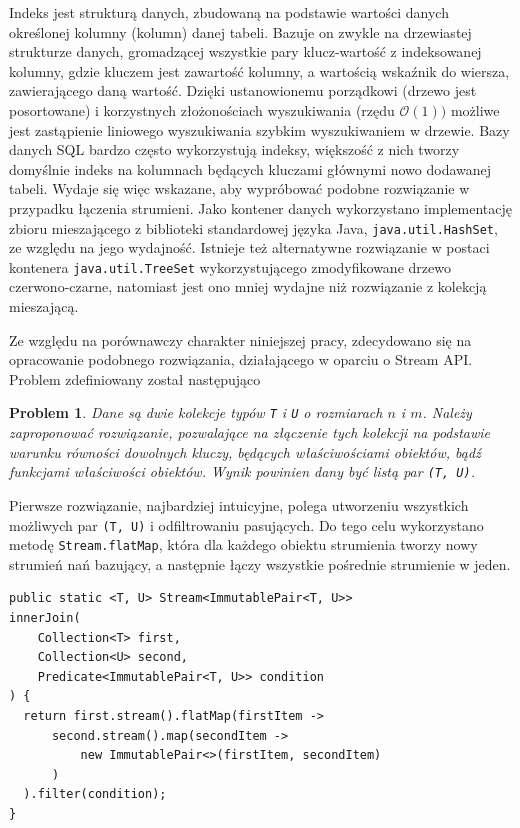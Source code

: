 \documentclass[12pt]{extarticle}
\newtheorem{theorem}{Problem}
\begin{document}
    Indeks jest strukturą danych, zbudowaną na podstawie wartości danych określonej kolumny (kolumn) danej tabeli. Bazuje on zwykle na drzewiastej strukturze danych, gromadzącej wszystkie pary klucz-wartość z indeksowanej kolumny, gdzie kluczem jest zawartość kolumny, a wartością wskaźnik do wiersza, zawierającego daną wartość. Dzięki ustanowionemu porządkowi (drzewo jest posortowane) i korzystnych złożonościach wyszukiwania (rzędu $ \mathcal{O}(1)) $ możliwe jest zastąpienie liniowego wyszukiwania szybkim wyszukiwaniem w drzewie. Bazy danych SQL bardzo często wykorzystują indeksy, większość z nich tworzy domyślnie indeks na kolumnach będących kluczami głównymi nowo dodawanej tabeli. Wydaje się więc wskazane, aby wypróbować podobne rozwiązanie w przypadku łączenia strumieni. Jako kontener danych wykorzystano implementację zbioru mieszającego z biblioteki standardowej języka Java, \texttt{java.util.HashSet}, ze względu na jego wydajność. Istnieje też alternatywne rozwiązanie w postaci kontenera \texttt{java.util.TreeSet} wykorzystującego zmodyfikowane drzewo czerwono-czarne, natomiast jest ono mniej wydajne niż rozwiązanie z kolekcją mieszającą.

    Ze względu na porównawczy charakter niniejszej pracy, zdecydowano się na opracowanie podobnego rozwiązania, działającego w oparciu o Stream API. Problem zdefiniowany został następująco

\begin{theorem}
    Dane są dwie kolekcje typów \texttt{T} i \texttt{U} o rozmiarach $ n $ i $ m $. Należy zaproponować rozwiązanie, pozwalające na złączenie tych kolekcji na podstawie warunku równości dowolnych kluczy, będących właściwościami obiektów, bądź funkcjami właściwości obiektów. Wynik powinien dany być listą par \texttt{(T, U)}.
\end{theorem}

    Pierwsze rozwiązanie, najbardziej intuicyjne, polega utworzeniu wszystkich możliwych par \texttt{(T, U)} i odfiltrowaniu pasujących. Do tego celu wykorzystano metodę \texttt{Stream.flatMap}, która dla każdego obiektu strumienia tworzy nowy strumień nań bazujący, a następnie łączy wszystkie pośrednie strumienie w jeden.

\begin{lstlisting}[label=join1, caption=Rozwiązanie nr 1]
public static <T, U> Stream<ImmutablePair<T, U>>
innerJoin(
    Collection<T> first,
    Collection<U> second,
    Predicate<ImmutablePair<T, U>> condition
) {
  return first.stream().flatMap(firstItem ->
      second.stream().map(secondItem ->
          new ImmutablePair<>(firstItem, secondItem)
      )
  ).filter(condition);
}

\end{lstlisting}
\end{document}
